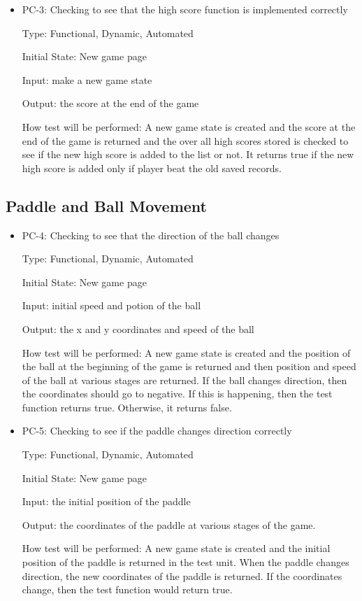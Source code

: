 \documentclass[12pt,letterpaper]{article}
\begin{document}
\begin{reqbox}
	\begin{itemize}
	\item PC-3: Checking to see that the high score function is implemented correctly

	Type: Functional, Dynamic, Automated

	Initial State: New game page

	Input: make a new game state

	Output: the score at the end of the game

	How test will be performed: A new game state is created and the score at the end of the game is returned and the over all high scores stored is checked to see if the new high score is added to the list or not. It returns true if the new high score is added only if player beat the old saved records.	
	\end{itemize}
\end{reqbox}

	\subsection{Paddle and Ball Movement}
\begin{reqbox}
	\begin{itemize}
	\item PC-4: Checking to see that the direction of the ball changes

	Type: Functional, Dynamic, Automated

	Initial State: New game page

	Input: initial speed and potion of the ball

	Output: the x and y coordinates and speed of the ball

	How test will be performed: A new game state is created and the position of the ball at the beginning of the game is returned and then position and speed of the ball at various stages are returned. If the ball changes direction, then the coordinates should go to negative. If this is happening, then the test function returns true. Otherwise, it returns false.
	\end{itemize}
\end{reqbox}

\begin{reqbox}
	\begin{itemize}
	\item PC-5: Checking to see if the paddle changes direction correctly

	Type: Functional, Dynamic, Automated
	
	Initial State: New game page

	Input: the initial position of the paddle

	Output: the coordinates of the paddle at various stages of the game.

	How test will be performed: A new game state is created and the initial position of the paddle is returned in the test unit. When the paddle changes direction, the new coordinates of the paddle is returned. If the coordinates change, then the test function would return true.
	\end{itemize}
\end{reqbox}
\end{document}
